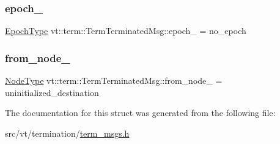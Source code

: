 \subsubsection{\texorpdfstring{epoch\+\_\+}{epoch\_}}
{\footnotesize\ttfamily \hyperlink{namespacevt_a985a5adf291c34a3ca263b3378388236}{Epoch\+Type} vt\+::term\+::\+Term\+Terminated\+Msg\+::epoch\+\_\+ = no\+\_\+epoch\hspace{0.3cm}{\ttfamily [private]}}

\mbox{\label{structvt_1_1term_1_1_term_terminated_msg_a393564a84f3a77e1ab7b31ee8c368d5b}} 
\subsubsection{\texorpdfstring{from\+\_\+node\+\_\+}{from\_node\_}}
{\footnotesize\ttfamily \hyperlink{namespacevt_a866da9d0efc19c0a1ce79e9e492f47e2}{Node\+Type} vt\+::term\+::\+Term\+Terminated\+Msg\+::from\+\_\+node\+\_\+ = uninitialized\+\_\+destination\hspace{0.3cm}{\ttfamily [private]}}



The documentation for this struct was generated from the following file\+:\begin{DoxyCompactItemize}
\item 
src/vt/termination/\hyperlink{term__msgs_8h}{term\+\_\+msgs.\+h}\end{DoxyCompactItemize}
